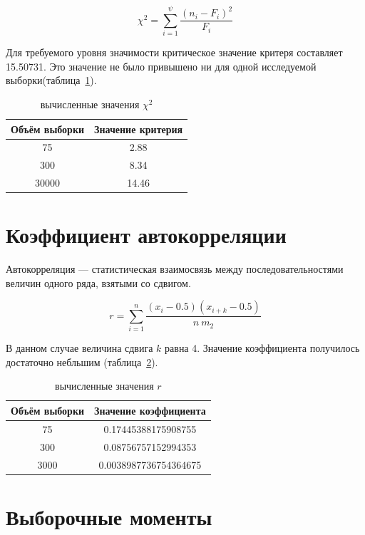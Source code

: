 \documentclass[a4paper,12pt]{article}
\begin{document}
{\large $$\chi^2 = \sum\limits_{i=1}^\psi \frac{(n_i - F_i)^2}{F_i}$$}

Для требуемого уровня значимости критическое значение критеря составляет 15.50731. Это значение не было привышено ни для одной исследуемой выборки(таблица~\ref{table:chi}).

\begin{table}[h]
	\caption{вычисленные значения $\chi^2$}
	\begin{tabular}{|c|c|}
	\hline 
	Объём выборки & Значение критерия \\ 
	\hline 
	75 & 2.88 \\ 
	\hline 
	300 & 8.34 \\ 
	\hline 
	30000 & 14.46 \\ 
	\hline 
	\end{tabular}
	
	\label{table:chi}
\end{table}



\newpage\section{Коэффициент автокорреляции}

Автокорреляция — статистическая взаимосвязь между последовательностями величин одного ряда, взятыми со сдвигом. 

{\large $$r = \sum\limits_{i=1}^n \frac{(x_i-0.5)(x_{i+k}-0.5)}{n \ m_2}$$}

В данном случае величина сдвига $k$ равна 4. Значение коэффициента получилось достаточно небльшим (таблица~\ref{table:r}).

\begin{table}[h]
	\caption{вычисленные значения $r$}
	\begin{tabular}{|c|c|}
	\hline 
	Объём выборки & Значение коэффициента \\ 
	\hline 
	75   & 0.17445388175908755   \\ 
	\hline 
	300  & 0.08756757152994353   \\ 
	\hline 
	3000 & 0.0038987736754364675 \\ 
	\hline 
	\end{tabular} 
	\label{table:r}
\end{table}

\newpage\section{Выборочные моменты}
\end{document}
